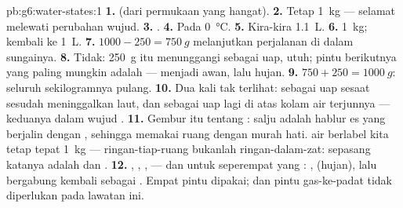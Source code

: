 \begin{solution}{pb:g6:water-states:1}
\textbf{1.}  (dari permukaan yang hangat).
\textbf{2.} Tetap \qty{1}{kg} ---  selamat melewati perubahan
wujud.
\textbf{3.} .
\textbf{4.} Pada \qty{0}{\celsius}.
\textbf{5.} Kira-kira \qty{1.1}{L}.
\textbf{6.}  \qty{1}{kg};  kembali ke \qty{1}{L}.
\textbf{7.} $1000 - 250 = \qty{750}{g}$ melanjutkan perjalanan di
dalam sungainya.
\textbf{8.} Tidak: \qty{250}{g} itu menunggangi  sebagai uap,
utuh; pintu berikutnya yang paling mungkin adalah  ---
menjadi awan, lalu hujan.
\textbf{9.} $750 + 250 = \qty{1000}{g}$: seluruh sekilogramnya pulang.
\textbf{10.} Dua kali tak terlihat: sebagai uap sesaat sesudah
meninggalkan laut, dan sebagai uap lagi di atas kolam air terjunnya
--- keduanya dalam wujud .
\textbf{11.} Gembur itu tentang \emph{}: salju adalah hablur es
yang berjalin dengan , sehingga memakai ruang dengan murah hati.
\emph{} air berlabel kita tetap tepat \qty{1}{kg} ---
ringan-tiap-ruang bukanlah ringan-dalam-zat: sepasang katanya adalah
 dan .
\textbf{12.} , , ,  --- dan
untuk seperempat yang : ,  (hujan), lalu
bergabung kembali sebagai . Empat pintu dipakai;  dan
pintu gas-ke-padat tidak diperlukan pada lawatan ini.
\end{solution}
